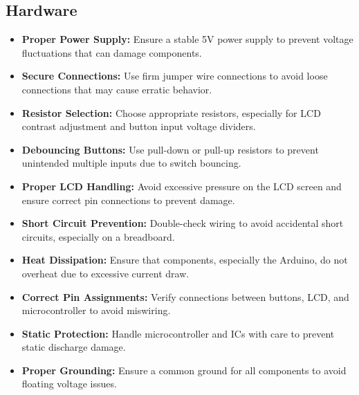 \documentclass[a4paper,12pt]{article}
\theoremstyle{remark}
\begin{document}
\subsection{Hardware}
\begin{itemize}
    \item \textbf{Proper Power Supply:} Ensure a stable 5V power supply to prevent voltage fluctuations that can damage components.
    \item \textbf{Secure Connections:} Use firm jumper wire connections to avoid loose connections that may cause erratic behavior.
    \item \textbf{Resistor Selection:} Choose appropriate resistors, especially for LCD contrast adjustment and button input voltage dividers.
    \item \textbf{Debouncing Buttons:} Use pull-down or pull-up resistors to prevent unintended multiple inputs due to switch bouncing.
    \item \textbf{Proper LCD Handling:} Avoid excessive pressure on the LCD screen and ensure correct pin connections to prevent damage.
    \item \textbf{Short Circuit Prevention:} Double-check wiring to avoid accidental short circuits, especially on a breadboard.
    \item \textbf{Heat Dissipation:} Ensure that components, especially the Arduino, do not overheat due to excessive current draw.
    \item \textbf{Correct Pin Assignments:} Verify connections between buttons, LCD, and microcontroller to avoid miswiring.
    \item \textbf{Static Protection:} Handle microcontroller and ICs with care to prevent static discharge damage.
    \item \textbf{Proper Grounding:} Ensure a common ground for all components to avoid floating voltage issues.
\end{itemize}
\end{document}
